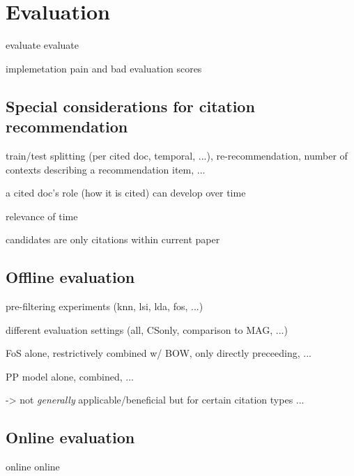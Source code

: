 \chapter{Evaluation}\label{chap:evaluation}
evaluate evaluate

implemetation pain and bad evaluation scores\cite{Beel2017}

\section{Special considerations for citation recommendation}
train/test splitting (per cited doc, temporal, ...), re-recommendation, number of contexts describing a recommendation item, ...

a cited doc's role (how it is cited) can develop over time\cite{Swales1986,He2018}

relevance of time\cite{Beel2017a}

candidates are only citations within current paper\cite{Duma2014}

\section{Offline evaluation}
pre-filtering experiments (knn\cite{Bhagavatula2018}, lsi, lda, fos, ...)

different evaluation settings (all, CSonly, comparison to MAG, ...)

FoS alone, restrictively combined w/ BOW, only directly preceeding, ...

PP model alone, combined, ...

-> not \emph{generally} applicable/beneficial but for certain citation types ...

\section{Online evaluation}
online online
